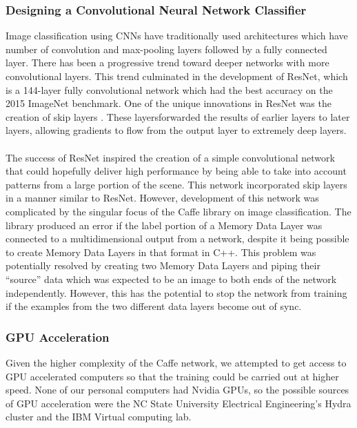 \documentclass[12pt]{article}
\begin{document}
\subsubsection{Designing a Convolutional Neural Network Classifier}

	Image classification using CNNs have traditionally used architectures which have number of convolution and max-pooling layers followed by a fully connected layer.  There has been a progressive trend toward deeper networks with more convolutional layers.  This trend culminated in the development of ResNet, which is a 144-layer fully convolutional network which had the best accuracy on the 2015 ImageNet benchmark.  One of the unique innovations in ResNet was the creation of skip layers \cite{he2015deep}. These layersforwarded the results of earlier layers to later layers, allowing gradients to flow from the output layer to extremely deep layers.\\ 
\\
	The success of ResNet inspired the creation of a simple convolutional network that could hopefully deliver high performance by being able to take into account patterns from a large portion of the scene.  This network incorporated skip layers in a manner similar to ResNet.  However, development of this network was complicated by the singular focus of the Caffe library on image classification.  The library produced an error if the label portion of a Memory Data Layer was connected to a multidimensional output from a network, despite it being possible to create Memory Data Layers in that format in C++.  This problem was potentially resolved by creating two Memory Data Layers and piping their “source” data which was expected to be an image to both ends of the network independently.  However, this has the potential to stop the network from training if the examples from the two different data layers become out of sync.

\subsubsection{GPU Acceleration}

	Given the higher complexity of the Caffe network, we attempted to get access to GPU accelerated computers so that the training could be carried out at higher speed.  None of our personal computers had Nvidia GPUs, so the possible sources of GPU acceleration were the NC State University Electrical Engineering's Hydra cluster and the IBM Virtual computing lab.
\end{document}
